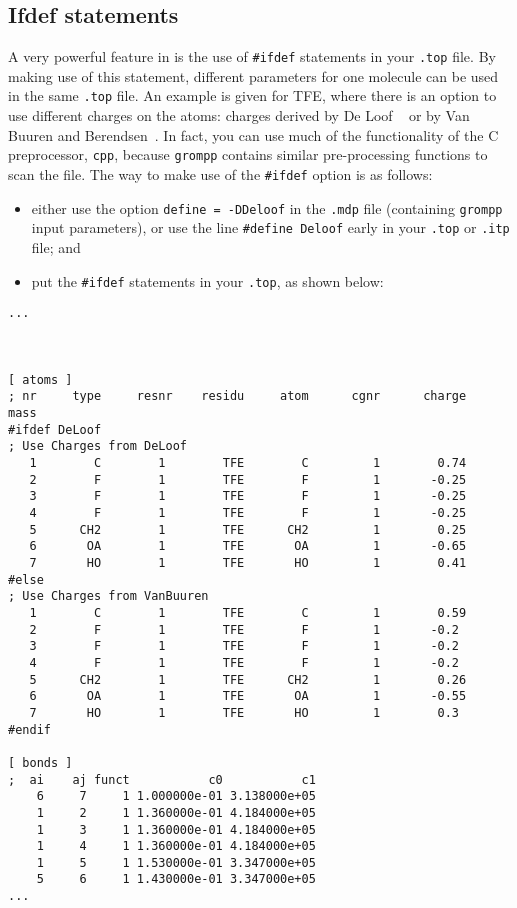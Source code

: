 \subsection{Ifdef statements}
\label{subsec:ifdef}
A very powerful feature in {\gromacs} is the use of {\tt \#ifdef}
statements in your {\tt *.top} file. By making use of this statement,
different parameters for one molecule can be used in the same
{\tt *.top} file. An example is given for TFE, where there is an option to
use different charges on the atoms: charges derived by De Loof
{\etal}~\cite{Loof92} or by Van Buuren and
Berendsen~\cite{Buuren93a}. In fact, you can use much of the functionality of the
C preprocessor, {\tt cpp}, because {\tt grompp} contains similar pre-processing
functions to scan the file.  The
way to make use of the {\tt \#ifdef} option is as follows:
\begin{itemize}
\item either use the option {\tt define = -DDeloof} in the
      {\tt *.mdp} file (containing {\tt grompp} input
      parameters), or use the line {\tt \#define Deloof}
      early in your {\tt *.top} or {\tt *.itp} file; and
\item put the {\tt \#ifdef} statements in your {\tt *.top}, as
      shown below: 
\end{itemize}

{\small
\begin{verbatim}
...



[ atoms ]
; nr     type     resnr    residu     atom      cgnr      charge        mass
#ifdef DeLoof
; Use Charges from DeLoof
   1        C        1        TFE        C         1        0.74        
   2        F        1        TFE        F         1       -0.25        
   3        F        1        TFE        F         1       -0.25        
   4        F        1        TFE        F         1       -0.25        
   5      CH2        1        TFE      CH2         1        0.25        
   6       OA        1        TFE       OA         1       -0.65        
   7       HO        1        TFE       HO         1        0.41        
#else
; Use Charges from VanBuuren
   1        C        1        TFE        C         1        0.59        
   2        F        1        TFE        F         1       -0.2         
   3        F        1        TFE        F         1       -0.2         
   4        F        1        TFE        F         1       -0.2         
   5      CH2        1        TFE      CH2         1        0.26        
   6       OA        1        TFE       OA         1       -0.55        
   7       HO        1        TFE       HO         1        0.3         
#endif

[ bonds ]
;  ai    aj funct           c0           c1
    6     7     1 1.000000e-01 3.138000e+05 
    1     2     1 1.360000e-01 4.184000e+05 
    1     3     1 1.360000e-01 4.184000e+05 
    1     4     1 1.360000e-01 4.184000e+05 
    1     5     1 1.530000e-01 3.347000e+05 
    5     6     1 1.430000e-01 3.347000e+05 
...
\end{verbatim}}

